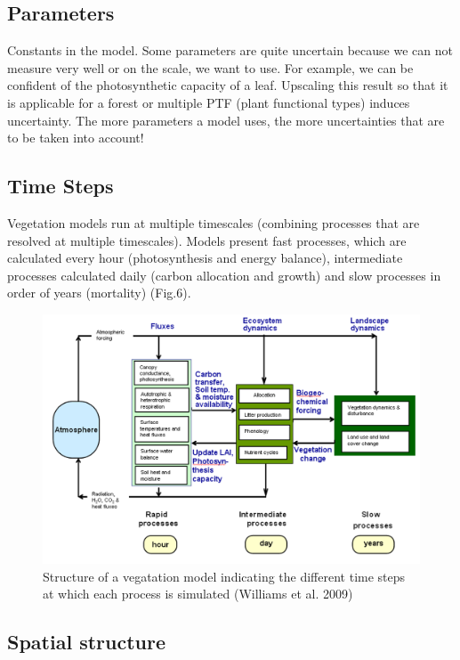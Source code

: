 \documentclass[12pt,oneside]{book}
\begin{document}
\subsection{Parameters}\label{parameters}

Constants in the model. Some parameters are quite uncertain because we
can not measure very well or on the scale, we want to use. For example,
we can be confident of the photosynthetic capacity of a leaf. Upscaling
this result so that it is applicable for a forest or multiple PTF (plant
functional types) induces uncertainty. The more parameters a model uses,
the more uncertainties that are to be taken into account!

\subsection{Time Steps}\label{time-steps}

Vegetation models run at multiple timescales (combining processes that
are resolved at multiple timescales). Models present fast processes,
which are calculated every hour (photosynthesis and energy balance),
intermediate processes calculated daily (carbon allocation and growth)
and slow processes in order of years (mortality) (Fig.6).

\begin{figure}

{\centering \includegraphics[width=0.8\linewidth]{figures/chap1/time_steps} 

}

\caption{Structure of a vegatation model indicating the different time steps at which each process is simulated (Williams et al. 2009)}\label{fig:f9}
\end{figure}

\subsection{Spatial structure}\label{spatial-structure}
\end{document}
